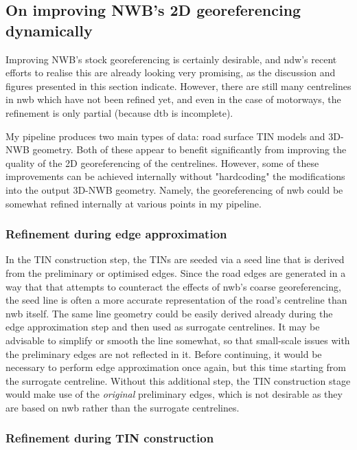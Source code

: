 \subsection{On improving NWB's 2D georeferencing dynamically}
\label{sub:nwb_updated_dynamic}

Improving NWB's stock georeferencing is certainly desirable, and \ac{ndw}'s recent efforts to realise this are already looking very promising, as the discussion and figures presented in this section indicate. However, there are still many centrelines in \ac{nwb} which have not been refined yet, and even in the case of motorways, the refinement is only partial (because \ac{dtb} is incomplete).

My pipeline produces two main types of data: road surface TIN models and 3D-NWB geometry. Both of these appear to benefit significantly from improving the quality of the 2D georeferencing of the centrelines. However, some of these improvements can be achieved internally without "hardcoding" the modifications into the output 3D-NWB geometry. Namely, the georeferencing of \ac{nwb} could be somewhat refined internally at various points in my pipeline.

\subsubsection{Refinement during edge approximation}

In the TIN construction step, the TINs are seeded via a seed line that is derived from the preliminary or optimised edges. Since the road edges are generated in a way that that attempts to counteract the effects of \ac{nwb}'s coarse georeferencing, the seed line is often a more accurate representation of the road's centreline than \ac{nwb} itself. The same line geometry could be easily derived already during the edge approximation step and then used as surrogate centrelines. It may be advisable to simplify or smooth the line somewhat, so that small-scale issues with the preliminary edges are not reflected in it. Before continuing, it would be necessary to perform edge approximation once again, but this time starting from the surrogate centreline. Without this additional step, the TIN construction stage would make use of the \textit{original} preliminary edges, which is not desirable as they are based on \ac{nwb} rather than the surrogate centrelines.

\subsubsection{Refinement during TIN construction}


